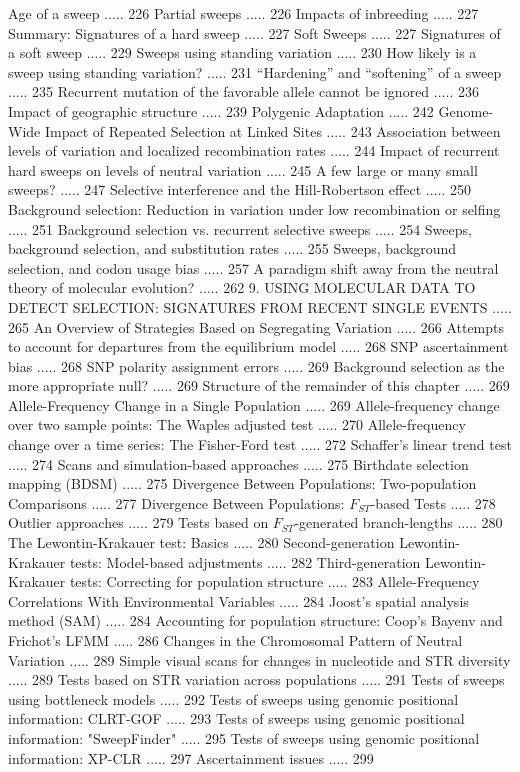 \documentclass{article}
\begin{document}
Age of a sweep ..... 226
Partial sweeps ..... 226
Impacts of inbreeding ..... 227
Summary: Signatures of a hard sweep ..... 227
Soft Sweeps ..... 227
Signatures of a soft sweep ..... 229
Sweeps using standing variation ..... 230
How likely is a sweep using standing variation? ..... 231
“Hardening” and “softening” of a sweep ..... 235
Recurrent mutation of the favorable allele cannot be ignored ..... 236
Impact of geographic structure ..... 239
Polygenic Adaptation ..... 242
Genome-Wide Impact of Repeated Selection at Linked Sites ..... 243
Association between levels of variation and localized recombination rates ..... 244
Impact of recurrent hard sweeps on levels of neutral variation ..... 245
A few large or many small sweeps? ..... 247
Selective interference and the Hill-Robertson effect ..... 250
Background selection: Reduction in variation under low recombination or selfing ..... 251
Background selection vs. recurrent selective sweeps ..... 254
Sweeps, background selection, and substitution rates ..... 255
Sweeps, background selection, and codon usage bias ..... 257
A paradigm shift away from the neutral theory of molecular evolution? ..... 262
9. USING MOLECULAR DATA TO DETECT SELECTION:
   SIGNATURES FROM RECENT SINGLE EVENTS ..... 265
An Overview of Strategies Based on Segregating Variation ..... 266
Attempts to account for departures from the equilibrium model ..... 268
SNP ascertainment bias ..... 268
SNP polarity assignment errors ..... 269
Background selection as the more appropriate null? ..... 269
Structure of the remainder of this chapter ..... 269
Allele-Frequency Change in a Single Population ..... 269
Allele-frequency change over two sample points: The Waples adjusted test ..... 270
Allele-frequency change over a time series: The Fisher-Ford test ..... 272
Schaffer's linear trend test ..... 274
Scans and simulation-based approaches ..... 275
Birthdate selection mapping (BDSM) ..... 275
Divergence Between Populations: Two-population Comparisons ..... 277
Divergence Between Populations:  $ F_{ST} $-based Tests ..... 278
Outlier approaches ..... 279
Tests based on  $ F_{ST} $-generated branch-lengths ..... 280
The Lewontin-Krakauer test: Basics ..... 280
Second-generation Lewontin-Krakauer tests: Model-based adjustments ..... 282
Third-generation Lewontin-Krakauer tests: Correcting for population structure ..... 283
Allele-Frequency Correlations With Environmental Variables ..... 284
Joost's spatial analysis method (SAM) ..... 284
Accounting for population structure: Coop's Bayenv and Frichot's LFMM ..... 286
Changes in the Chromosomal Pattern of Neutral Variation ..... 289
Simple visual scans for changes in nucleotide and STR diversity ..... 289
Tests based on STR variation across populations ..... 291
Tests of sweeps using bottleneck models ..... 292
Tests of sweeps using genomic positional information: CLRT-GOF ..... 293
Tests of sweeps using genomic positional information: "SweepFinder" ..... 295
Tests of sweeps using genomic positional information: XP-CLR ..... 297
Ascertainment issues ..... 299
\end{document}
